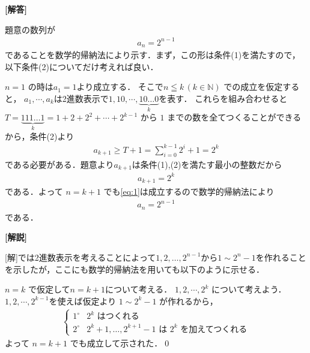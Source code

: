 \documentclass[../../main.tex]{subfiles}
\begin{document}
\begin{oframed}
  
\end{oframed}

{\bf [解答]}

題意の数列が
\begin{align}
  a_n = 2^{n-1} \label{eq:1}
\end{align}
であることを数学的帰納法により示す．まず，この形は条件(1)を満たすので，以下条件(2)についてだけ考えれば良い．

$n=1$ の時は$a_1=1$より成立する．
そこで$n \leqq k\, (k \in \mathbb{N})$ での成立を仮定すると，
$a_1,\cdots,a_k$は2進数表示で$1,10,\cdots,\underbrace{10\dots 0}_{k}$を表す．
これらを組み合わせると$T = \underbrace{111\dots1}_{k}=1+2+2^{2}+\cdots+2^{k-1}$ から $1$ までの数を全てつくることができるから，条件(2)より
\begin{align}
  a_{k+1} \ge T + 1 = \sum_{i=0}^{k-1}2^{i}+1 = 2^{k}
\end{align}
である必要がある．題意より$a_{k+1}$は条件(1),(2)を満たす最小の整数だから
\begin{align}
  a_{k+1} = 2^{k}
\end{align}
である．よって $n = k+1$ でも\cref{eq:1}は成立するので数学的帰納法により
\begin{align}
  a_n = 2^{n-1}
\end{align}
である．

{\bf [解説]}

[解]では2進数表示を考えることによって$1, 2, \dots, 2^{n-1}$から$1 \sim 2^{n}-1$を作れることを示したが，ここにも数学的帰納法を用いても以下のように示せる．

$n=k$ で仮定して$n=k+1$について考える．
$1, 2, \cdots, 2^{k}$ について考えよう．
$1, 2, \cdots, 2^{k-1}$を使えば仮定より
$1 \sim 2^{k}-1$ が作れるから，
\begin{align}
  \begin{cases}
    1^\circ & 2^{k} \text{ はつくれる} \\
    2^\circ & 2^{k}+1, \dots, 2^{k+1}-1 \text{ は } 2^{k} \text{ を加えてつくれる}
  \end{cases}
\end{align}
よって $n = k+1$ でも成立して示された．\qed
\end{document}
